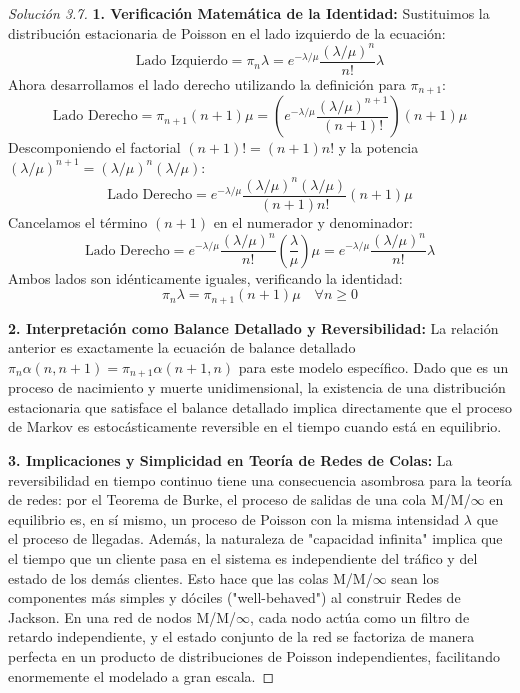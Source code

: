 \documentclass[10pt,a4paper]{article}
\begin{document}
\begin{proof}[Solución 3.7]
    \textbf{1. Verificación Matemática de la Identidad:}
    Sustituimos la distribución estacionaria de Poisson en el lado izquierdo de la ecuación:
    $$ \text{Lado Izquierdo} = \pi_n \lambda = e^{-\lambda/\mu} \frac{(\lambda/\mu)^n}{n!} \lambda $$
    Ahora desarrollamos el lado derecho utilizando la definición para $\pi_{n+1}$:
    $$ \text{Lado Derecho} = \pi_{n+1}(n+1)\mu = \left( e^{-\lambda/\mu} \frac{(\lambda/\mu)^{n+1}}{(n+1)!} \right) (n+1)\mu $$
    Descomponiendo el factorial $(n+1)! = (n+1)n!$ y la potencia $(\lambda/\mu)^{n+1} = (\lambda/\mu)^n (\lambda/\mu)$:
    $$ \text{Lado Derecho} = e^{-\lambda/\mu} \frac{(\lambda/\mu)^n (\lambda/\mu)}{(n+1)n!} (n+1)\mu $$
    Cancelamos el término $(n+1)$ en el numerador y denominador:
    $$ \text{Lado Derecho} = e^{-\lambda/\mu} \frac{(\lambda/\mu)^n}{n!} \left( \frac{\lambda}{\mu} \right) \mu = e^{-\lambda/\mu} \frac{(\lambda/\mu)^n}{n!} \lambda $$
    Ambos lados son idénticamente iguales, verificando la identidad:
    $$ \pi_n \lambda = \pi_{n+1}(n+1)\mu \quad \forall n \ge 0 $$

    \textbf{2. Interpretación como Balance Detallado y Reversibilidad:}
    La relación anterior es exactamente la ecuación de balance detallado $\pi_n \alpha(n, n+1) = \pi_{n+1} \alpha(n+1, n)$ para este modelo específico. Dado que es un proceso de nacimiento y muerte unidimensional, la existencia de una distribución estacionaria que satisface el balance detallado implica directamente que el proceso de Markov es estocásticamente reversible en el tiempo cuando está en equilibrio.
    
    \textbf{3. Implicaciones y Simplicidad en Teoría de Redes de Colas:}
    La reversibilidad en tiempo continuo tiene una consecuencia asombrosa para la teoría de redes: por el Teorema de Burke, el proceso de salidas de una cola M/M/$\infty$ en equilibrio es, en sí mismo, un proceso de Poisson con la misma intensidad $\lambda$ que el proceso de llegadas. 
    Además, la naturaleza de "capacidad infinita" implica que el tiempo que un cliente pasa en el sistema es independiente del tráfico y del estado de los demás clientes. Esto hace que las colas M/M/$\infty$ sean los componentes más simples y dóciles ("well-behaved") al construir Redes de Jackson. En una red de nodos M/M/$\infty$, cada nodo actúa como un filtro de retardo independiente, y el estado conjunto de la red se factoriza de manera perfecta en un producto de distribuciones de Poisson independientes, facilitando enormemente el modelado a gran escala.
\end{proof}
\end{document}
